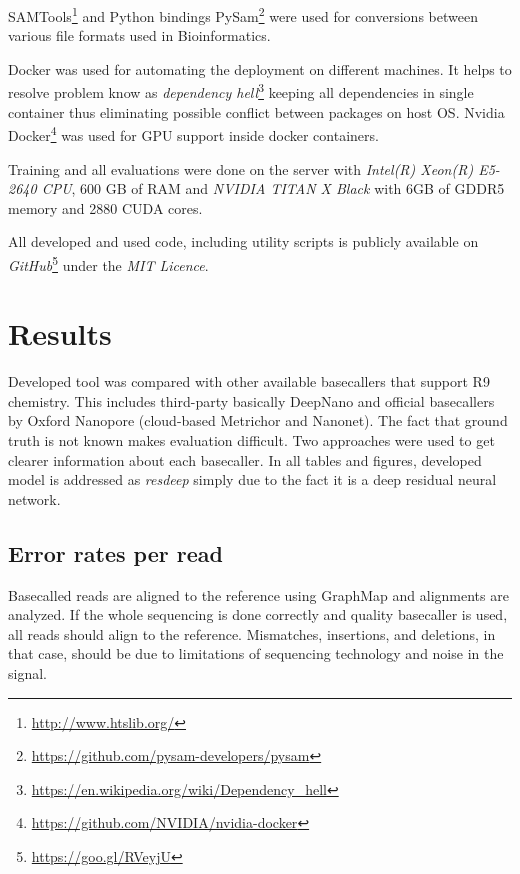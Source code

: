 \documentclass[times, utf8, diplomski, numeric, english]{fer}
\begin{document}
SAMTools\footnote{\url{http://www.htslib.org/}} and Python bindings PySam\footnote{\url{https://github.com/pysam-developers/pysam}} were used for conversions between various file formats used in Bioinformatics.

Docker was used for automating the deployment on different machines. It helps to resolve problem know as \textit{dependency hell}\footnote{\url{https://en.wikipedia.org/wiki/Dependency_hell}}  keeping all dependencies in single container thus eliminating possible conflict between packages on host OS.
Nvidia Docker\footnote{\url{https://github.com/NVIDIA/nvidia-docker}} was used for GPU support inside docker containers.


Training and all evaluations were done on the server with  \textit{Intel(R) Xeon(R) E5-2640 CPU}, 600 GB of RAM and \textit{NVIDIA TITAN X Black} with 6GB of GDDR5 memory and 2880 CUDA cores.

All developed and used code, including utility scripts is publicly available on \textit{GitHub}\footnote{\url{https://goo.gl/RVeyjU}} under the \textit{MIT Licence}.

\chapter{Results}
Developed tool was compared with other available basecallers that support R9 chemistry. This includes third-party basically DeepNano and official basecallers by Oxford Nanopore (cloud-based Metrichor and Nanonet).
The fact that ground truth is not known makes evaluation difficult. Two approaches were used to get clearer information about each basecaller.
In all tables and figures, developed model is addressed as \textit{resdeep} simply due to the fact it is a deep residual neural network.



\section{Error rates per read}

Basecalled reads are aligned to the reference using GraphMap and alignments are analyzed. If the whole sequencing is done correctly and quality basecaller is used, all reads should align to the reference. Mismatches, insertions, and deletions, in that case, should be due to limitations of sequencing technology and noise in the signal.
\end{document}
